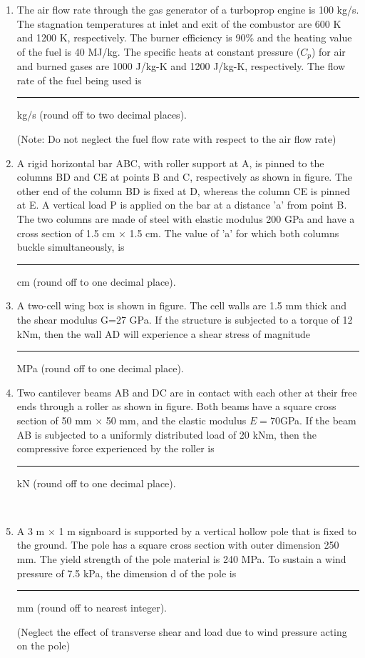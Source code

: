 \documentclass[journal,12pt,onecolumn]{IEEEtran}
\theoremstyle{remark}
\begin{document}
\begin{enumerate}
\item The air flow rate through the gas generator of a turboprop engine is 100 kg/s. The stagnation temperatures at inlet and exit of the combustor are 600 K and 1200 K, respectively. The burner efficiency is 90\% and the heating value of the fuel is 40 MJ/kg. The specific heats at constant pressure ($C_p$) for air and burned gases are 1000 J/kg-K and 1200 J/kg-K, respectively. The flow rate of the fuel being used is \rule{1.5cm}{0.4pt} kg/s (round off to two decimal places).

(Note: Do not neglect the fuel flow rate with respect to the air flow rate)

\item A rigid horizontal bar ABC, with roller support at A, is pinned to the columns BD and CE at points B and C, respectively as shown in figure. The other end of the column BD is fixed at D, whereas the column CE is pinned at E. A vertical load P is applied on the bar at a distance 'a' from point B.\\
The two columns are made of steel with elastic modulus 200 GPa and have a cross section of 1.5 cm $\times$ 1.5 cm. The value of 'a' for which both columns buckle simultaneously, is \rule{2cm}{0.4pt}cm (round off to one decimal place).



\item A two-cell wing box is shown in figure. The cell walls are 1.5 mm thick and the shear modulus G=27 GPa. If the structure is subjected to a torque of 12 kNm, then the wall AD will experience a shear stress of magnitude \rule{2cm}{0.4pt}MPa (round off to one decimal place).


\item Two cantilever beams AB and DC are in contact with each other at their free ends through a roller as shown in figure. Both beams have a square cross section of 50 mm $\times$ 50 mm, and the elastic modulus $E=70 $GPa. If the beam AB is subjected to a uniformly distributed load of 20 kNm, then the compressive force experienced by the roller is \rule{2cm}{0.4pt}kN (round off to one decimal place).

\\
\item A 3 m $\times$ 1 m signboard is supported by a vertical hollow pole that is fixed to the ground. The pole has a square cross section with outer dimension 250 mm. The yield strength of the pole material is 240 MPa. To sustain a wind pressure of 7.5 kPa, the dimension d of the pole is \rule{2cm}{0.4pt}mm (round off to nearest integer).

(Neglect the effect of transverse shear and load due to wind pressure acting on the pole)


\end{enumerate}
\end{document}
